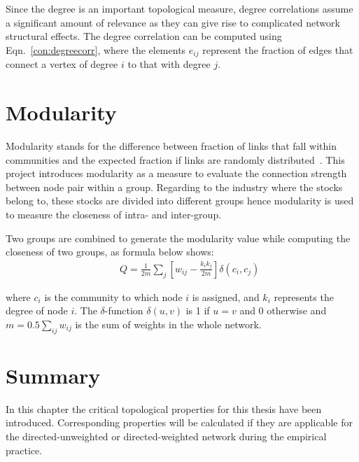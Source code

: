Since the degree is an important topological measure, degree correlations assume a significant amount of relevance as they can give rise to complicated network structural effects. The degree correlation can be computed using Eqn.~\ref{con:degreecorr}, where the elements $e_{ij}$ represent the fraction of edges that connect a vertex of degree $i$ to that with degree $j$.

\section{Modularity}
Modularity stands for the difference between fraction of links that fall within communities and the expected fraction if links are randomly distributed~\cite{newman2004finding}. This project introduces modularity as a measure to evaluate the connection strength between node pair within a group. Regarding to the industry where the stocks belong to, these stocks are divided into different groups hence modularity is used to measure the closeness of intra- and inter-group.

Two groups are combined to generate the modularity value while computing the closeness of two groups, as formula below shows:
\begin{eqnarray}
&&Q=\frac{1}{2m}\sum_{j}\left[w_{ij}-\frac{k_ik_j}{2m}\right]\delta\left(c_i,c_j\right)
\end{eqnarray}

where $c_i$ is the community to which node $i$ is assigned, and $k_i$ represents the degree of node $i$. The $\delta$-function $\delta(u,v)$ is 1 if $u=v$ and 0 otherwise and $m=0.5\sum_{ij}w_{ij}$ is the sum of weights in the whole network.

\section{Summary}
In this chapter the critical topological properties for this thesis have been introduced. Corresponding properties will be calculated if they are applicable for the directed-unweighted or directed-weighted network during the empirical practice.